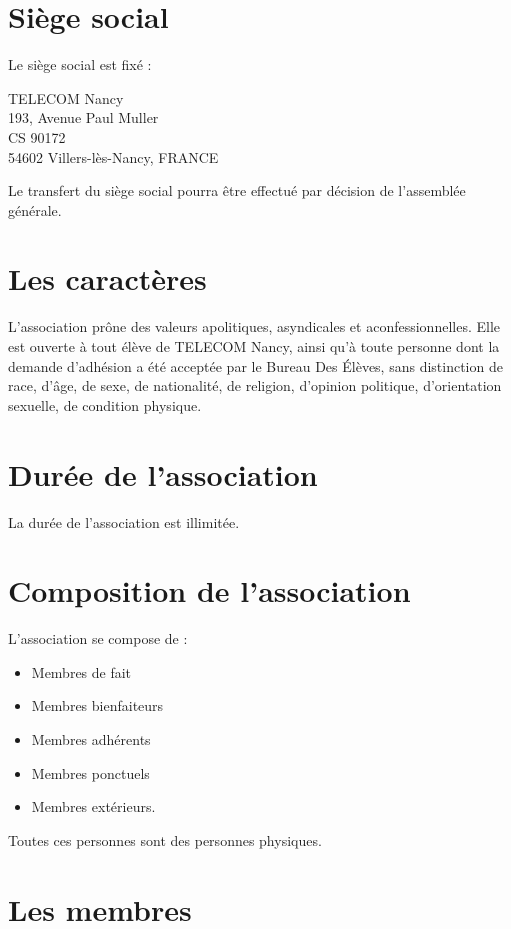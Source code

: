 \documentclass{article} %
\begin{document}
	\section{Siège social}
		Le siège social est fixé :
		\begin{center}
			TELECOM Nancy\\
			193, Avenue Paul Muller\\
			CS 90172\\
			54602 Villers-lès-Nancy, FRANCE
		\end{center}

		Le transfert du siège social pourra être effectué par décision de l’assemblée générale.

	\section{Les caractères}
		L’association prône des valeurs apolitiques, asyndicales et aconfessionnelles.
		Elle est ouverte à tout élève de TELECOM Nancy, ainsi qu’à toute personne dont la demande d’adhésion
		a été acceptée par le Bureau Des Élèves, sans distinction de race, d'âge, de sexe, de nationalité,
		de religion, d’opinion politique, d’orientation sexuelle, de condition physique.

	\section{Durée de l’association}
		La durée de l’association est illimitée.

	\section{Composition de l’association}
		L’association se compose de :
		\begin{itemize}
			\item Membres de fait
			\item Membres bienfaiteurs
			\item Membres adhérents
			\item Membres ponctuels
			\item Membres extérieurs.
		\end{itemize}

		Toutes ces personnes sont des personnes physiques.

	\section{Les membres}
\end{document}
